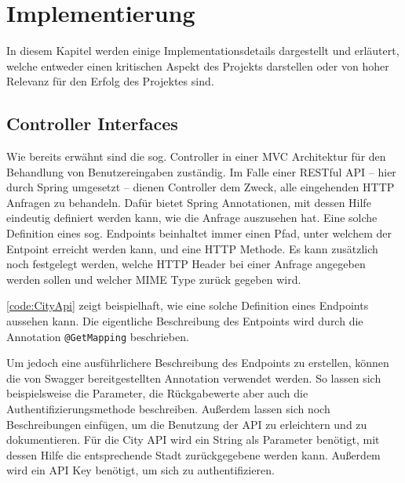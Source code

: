 \chapter{Implementierung}

	In diesem Kapitel werden einige Implementationsdetails dargestellt und erläutert, welche entweder einen kritischen Aspekt des Projekts darstellen oder von hoher Relevanz für den Erfolg des Projektes sind. 
	
	\section{Controller Interfaces}
	
		Wie bereits erwähnt sind die sog. Controller in einer \acs{MVC} Architektur für den Behandlung von Benutzereingaben zuständig. Im Falle einer \acs{REST}ful \acs{API} -- hier durch Spring umgesetzt -- dienen Controller dem Zweck, alle eingehenden \acs{HTTP} Anfragen zu behandeln. Dafür bietet Spring Annotationen, mit dessen Hilfe eindeutig definiert werden kann, wie die Anfrage auszusehen hat. Eine solche Definition eines sog. Endpoints beinhaltet immer einen Pfad, unter welchem der Entpoint erreicht werden kann, und eine \acs{HTTP} Methode. Es kann zusätzlich noch festgelegt werden, welche \acs{HTTP} Header bei einer Anfrage angegeben werden sollen und welcher \acs{MIME} Type zurück gegeben wird.
		
		\autoref{code:CityApi} zeigt beispielhaft, wie eine solche Definition eines Endpoints aussehen kann. Die eigentliche Beschreibung des Entpoints wird durch die Annotation \lstinline|@GetMapping| beschrieben. 	
		
		Um jedoch eine ausführlichere Beschreibung des Endpoints zu erstellen, können die von Swagger bereitgestellten Annotation verwendet werden. So lassen sich beispielsweise die Parameter, die Rückgabewerte aber auch die Authentifizierungsmethode beschreiben. Außerdem lassen sich noch Beschreibungen einfügen, um die Benutzung der \acs{API} zu erleichtern und zu dokumentieren. Für die City \acs{API} wird ein String als Parameter benötigt, mit dessen Hilfe die entsprechende Stadt zurückgegebene werden kann. Außerdem wird ein \acs{API} Key benötigt, um sich zu authentifizieren. 
		
		
		
